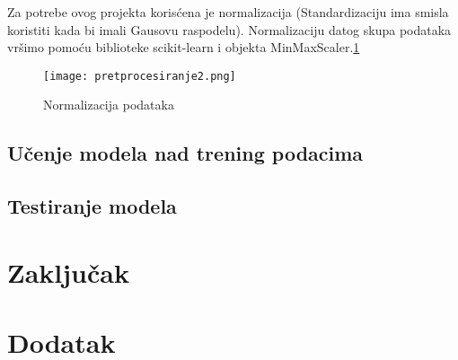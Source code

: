 \documentclass[a4paper]{article}
\begin{document}
Za potrebe ovog projekta korisćena je normalizacija (Standardizaciju ima smisla koristiti kada bi imali Gausovu raspodelu). Normalizaciju datog skupa podataka vršimo pomoću biblioteke scikit-learn i objekta MinMaxScaler.\ref{fig:Pretprocesiranje2}

\begin{figure}[htp]
    \centering
    \texttt{[image: pretprocesiranje2.png]}
    \caption{Normalizacija podataka}
    \label{fig:Pretprocesiranje2}
\end{figure}



\subsection{Učenje modela nad trening podacima}
\subsection{Testiranje modela}


\section{Zaključak}
\label{sec:zakljucak}


\appendix
 


\appendix
\section{Dodatak}
\end{document}
